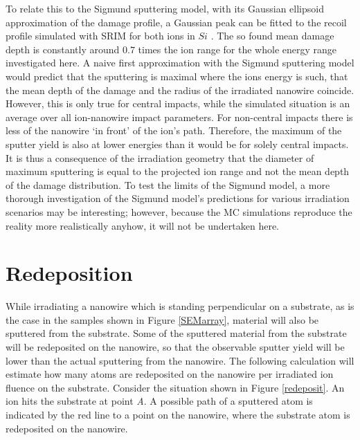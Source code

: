 To relate this to the Sigmund sputtering model, with its Gaussian ellipsoid approximation of the damage profile, a Gaussian peak can be fitted to the recoil profile simulated with SRIM for both ions in $Si$ \cite{bobes_ion_2012}. The so found mean damage depth is constantly around $0.7$ times the ion range for the whole energy range investigated here. A naive first approximation with the Sigmund sputtering model would predict that the sputtering is maximal where the ions energy is such, that the mean depth of the damage and the radius of the irradiated nanowire coincide. However, this is only true for central impacts, while the simulated situation is an average over all ion-nanowire impact parameters. For non-central impacts there is less of the nanowire `in front' of the ion's path. Therefore, the maximum of the sputter yield is also at lower energies than it would be for solely central impacts. It is thus a consequence of the irradiation geometry that the diameter of maximum sputtering is equal to the projected ion range and not the mean depth of the damage distribution. To test the limits of the Sigmund model, a more thorough investigation of the Sigmund model's predictions for various irradiation scenarios may be interesting; however, because the MC simulations reproduce the reality more realistically anyhow, it will not be undertaken here.


\vfill
\section{Redeposition}
\label{sec:redeposition}

While irradiating a nanowire which is standing perpendicular on a substrate, as is the case in the samples shown in Figure \ref{SEMarray}, material will also be sputtered from the substrate. Some of the sputtered material from the substrate will be redeposited on the nanowire, so that the observable sputter yield will be lower than the actual sputtering from the nanowire. The following calculation will estimate how many atoms are redeposited on the nanowire per irradiated ion fluence on the substrate. Consider the situation shown in Figure \ref{redeposit}. An ion hits the substrate at point \emph{A}. A possible path of a sputtered atom is indicated by the red line to a point on the nanowire, where the substrate atom is redeposited on the nanowire. 


